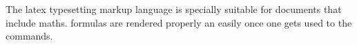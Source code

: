 \documentclass[12pt]{base} %
\begin{document}


The \Gls{latex} typesetting markup language is specially suitable 
for documents that include \gls{maths}. \Glspl{formula} are rendered 
properly an easily once one gets used to the commands.

\printglossary


\appendix




\backmatter



\printbibliography
\end{document}
